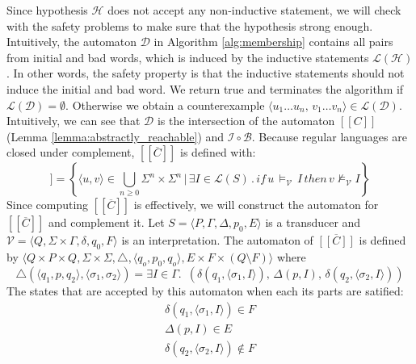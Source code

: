 Since hypothesis $\mathcal{H}$ does not accept any 
non-inductive statement, we will check with the safety problems
to make sure that the hypothesis strong enough.
Intuitively, the automaton $\mathcal{D}$ in Algorithm \ref*{alg:membership} contains all pairs from initial and bad words,
which is induced by the inductive statements $\mathcal{L}(\mathcal{H})$.
In other words, the safety property is that the inductive statements should not induce the
initial and bad word. We return true and terminates the algorithm if $\mathcal{L}(\mathcal{D}) = \emptyset$.
Otherwise we obtain a counterexample 
$\langle u_1 \dots u_n, \, v_1 \dots v_n \rangle \in \mathcal{L}(\mathcal{D})$.
Intuitively, we can see that $\mathcal{D}$ is the intersection of
the automaton $[[C]]$ (Lemma \ref{lemma:abstractly_reachable}) and $\mathcal{I} \circ  \mathcal{B}$.
Because regular languages are closed under complement, $[[\overline{C}]]$ is defined with:
\begin{equation}
    [[\overline{C}]] = \left\lbrace \langle u,v\rangle \in \bigcup_{n \geq 0} \Sigma^n \times \Sigma^n \, | \, \exists I \in \mathcal{L}(S) \, . \, if \, u \, \models_{\mathcal{V}} \, I \, then \, v \not\models_{\mathcal{V}} I \right\rbrace
\end{equation}
Since computing $[[\overline{C}]]$ is effectively, we will construct the automaton for $[[\overline{C}]]$ and complement it.
Let $S =  \langle P, \Gamma, \Delta, p_0, E \rangle$ 
is a transducer and  $\mathcal{V} =  \langle Q, \Sigma \times \Gamma, \delta, q_0, F \rangle$ is 
an interpretation. The automaton of $\overline{[[C]]}$ 
is defined by $\langle Q \times P \times Q, \Sigma \times \Sigma, \triangle, \langle q_o,  p_0, q_o \rangle, 
E \times F \times (Q \setminus F) \rangle$ where
\begin{equation*}
    \triangle(\langle q_1, p, q_2 \rangle, \langle \sigma_1, \sigma_2 \rangle) =  \exists I \in \Gamma. \,\,\,
    (\delta(q_1, \langle \sigma_1, I \rangle) ,\, \Delta(p, I) ,\, \delta(q_2, \langle \sigma_2, I \rangle))
\end{equation*}
The states that are accepted by this automaton when each its parts are satified: 
\begin{align*} 
    \delta(q_1, \langle \sigma_1, I \rangle) \in  F \\
    \Delta(p, I) \in E \\
    \delta(q_2, \langle \sigma_2, I \rangle) \notin  F
\end{align*}

